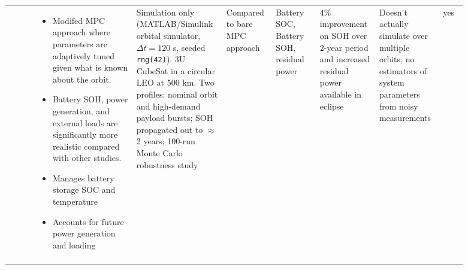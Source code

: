 {\begin{longtable}{@{}p{0.06\linewidth}p{0.20\linewidth}p{0.16\linewidth}p{0.10\linewidth}p{0.09\linewidth}p{0.11\linewidth}p{0.12\linewidth}p{0.05\linewidth}@{}}
    \cite{akarneSelfAdaptiveEnergyAwarePower2026} & 
    \begin{minipage}[t]{\linewidth}
    \begin{itemize}[nosep, left-margin=1em]
        \item Modifed MPC approach where parameters are adaptively tuned given what is known about the orbit.
        \item Battery SOH, power generation, and external loads are significantly more realistic compared with other studies.
        \item Manages battery storage SOC and temperature
        \item Accounts for future power generation and loading\strut
    \end{itemize}
    \end{minipage} &
    Simulation only (MATLAB/Simulink orbital simulator, $\Delta t = 120$ s, seeded \texttt{rng(42)}). 3U CubeSat in a circular LEO at 500 km. Two profiles: nominal orbit and high-demand payload bursts; SOH propagated out to $\approx$2 years; 100-run Monte Carlo robustness study &
    Compared to bare MPC approach &
    Battery SOC, Battery SOH, residual power & 
    4\% improvement on SOH over 2-year period and increased residual power available in eclipse & 
    Doesn't actually simulate over multiple orbits; no estimators of system parameters from noisy measurements & 
    yes \\
    \addlinespace
    

\end{longtable}}
